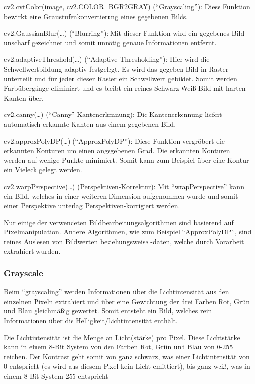\begin{compactitem}
    \item cv2.cvtColor(image, cv2.COLOR\_BGR2GRAY) (``Grayscaling''): Diese Funktion bewirkt eine Graustufenkonvertierung eines gegebenen Bilds.
    \item cv2.GaussianBlur(\dots) (``Blurring''): Mit dieser Funktion wird ein gegebenes Bild unscharf gezeichnet und somit unnötig genaue Informationen entfernt.
    \item cv2.adaptiveThreshold(\dots) (``Adaptive Thresholding''): Hier wird die Schwellwertbildung adaptiv festgelegt. Es wird das gegeben Bild in Raster unterteilt und für jeden dieser Raster ein Schwellwert gebildet. Somit werden Farbübergänge eliminiert und es bleibt ein reines Schwarz-Weiß-Bild mit harten Kanten über.
    \item cv2.canny(\dots) (``Canny'' Kantenerkennung): Die Kantenerkennung liefert automatisch erkannte Kanten aus einem gegebenen Bild.
    \item cv2.approxPolyDP(\dots) (``ApproxPolyDP''): Diese Funktion vergröbert die erkannten Konturen um einen angegebenen Grad. Die erkannten Konturen werden auf wenige Punkte minimiert. Somit kann zum Beispiel über eine Kontur ein Vieleck gelegt werden.
    \item cv2.warpPerspective(\dots) (Perspektiven-Korrektur): Mit ``wrapPerspective'' kann ein Bild, welches in einer weiteren Dimension aufgenommen wurde und somit einer Perspektive unterlag Perspektiven-korrigiert werden.
\end{compactitem}

Nur einige der verwendeten Bildbearbeitungsalgorithmen sind basierend auf Pixelmanipulation. Andere Algorithmen, wie zum Beispiel ``ApproxPolyDP'', sind reines Auslesen von Bildwerten beziehungsweise -daten, welche durch Vorarbeit extrahiert wurden.


\subsubsection{Grayscale}\label{maai:grayscale}
Beim ``grayscaling'' werden Informationen über die Lichtintensität aus den einzelnen Pixeln extrahiert und über eine Gewichtung der drei Farben Rot, Grün und Blau gleichmäßig gewertet. Somit entsteht ein Bild, welches rein Informationen über die Helligkeit/Lichtintensität enthält.

Die Lichtintensität ist die Menge an Licht(stärke) pro Pixel. Diese Lichtstärke kann in einem 8-Bit System von den Farben Rot, Grün und Blau von 0-255 reichen. Der Kontrast geht somit von ganz schwarz, was einer Lichtintensität von 0 entspricht (es wird aus diesem Pixel kein Licht emittiert), bis ganz weiß, was in einem 8-Bit System 255 entspricht.

